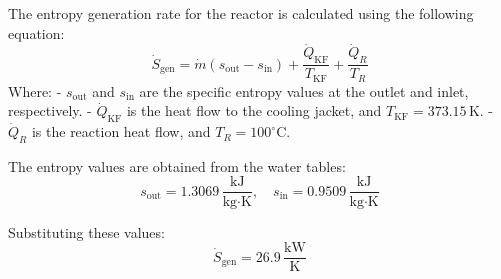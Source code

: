 The entropy generation rate for the reactor is calculated using the following equation:  
\[
\dot{S}_{\text{gen}} = \dot{m} \left( s_{\text{out}} - s_{\text{in}} \right) + \frac{\dot{Q}_{\text{KF}}}{T_{\text{KF}}} + \frac{\dot{Q}_R}{T_R}
\]  
Where:  
- \( s_{\text{out}} \) and \( s_{\text{in}} \) are the specific entropy values at the outlet and inlet, respectively.  
- \( \dot{Q}_{\text{KF}} \) is the heat flow to the cooling jacket, and \( T_{\text{KF}} = 373.15 \, \text{K} \).  
- \( \dot{Q}_R \) is the reaction heat flow, and \( T_R = 100^\circ\text{C} \).  

The entropy values are obtained from the water tables:  
\[
s_{\text{out}} = 1.3069 \, \frac{\text{kJ}}{\text{kg·K}}, \quad s_{\text{in}} = 0.9509 \, \frac{\text{kJ}}{\text{kg·K}}
\]  

Substituting these values:  
\[
\dot{S}_{\text{gen}} = 26.9 \, \frac{\text{kW}}{\text{K}}
\]